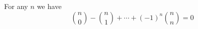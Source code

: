 

\setcounter{section}{3}
\setcounter{subsection}{4}
\setcounter{dfn}{7}

\begin{thm}
\label{thm:BinAltern}
For any $n$ we have
\[
\binom{n}{0} - \binom{n}{1} + \cdots + (-1)^n\binom{n}{n} = 0
\]
\end{thm}


